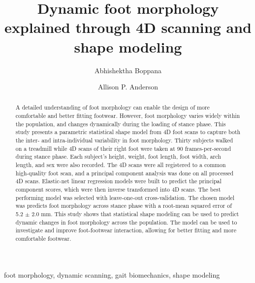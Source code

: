 \documentclass[preprint]{elsarticle}
\begin{document}
\begin{frontmatter}

\title{Dynamic foot morphology explained through 4D scanning and shape modeling}



\author[CUAero]{Abhishektha Boppana}




\author[CUAero]{Allison P. Anderson}




\address[CUAero]{Ann and H.J. Smead Department of Aerospace Engineering Sciences, University of Colorado Boulder, USA}




\begin{abstract}
A detailed understanding of foot morphology can enable the design of more comfortable and better fitting footwear. However, foot morphology varies widely within the population, and changes dynamically during the loading of stance phase. This study presents a parametric statistical shape model from 4D foot scans to capture both the inter- and intra-individual variability in foot morphology. Thirty subjects walked on a treadmill while 4D scans of their right foot were taken at 90 frames-per-second during stance phase. Each subject's height, weight, foot length, foot width, arch length, and sex were also recorded. The 4D scans were all registered to a common high-quality foot scan, and a principal component analysis was done on all processed 4D scans. Elastic-net linear regression models were built to predict the principal component scores, which were then inverse transformed into 4D scans. The best performing model was selected with leave-one-out cross-validation. The chosen model was predicts foot morphology across stance phase with a root-mean squared error of 5.2 \(\pm\) 2.0 mm. This study shows that statistical shape modeling can be used to predict dynamic changes in foot morphology across the population. The model can be used to investigate and improve foot-footwear interaction, allowing for better fitting and more comfortable footwear.
\end{abstract}

\begin{keyword}
foot morphology, dynamic scanning, gait biomechanics, shape modeling
\end{keyword}

\end{frontmatter}
\end{document}
